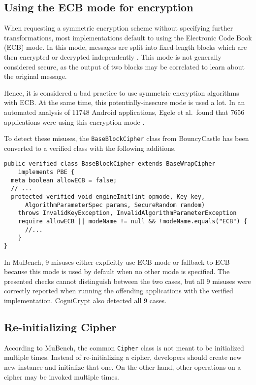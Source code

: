 \documentclass{article}
\newcommand{\etal}{et al.\ }
\begin{document}
\subsection{Using the ECB mode for encryption}\label{sec:MuBench:ECB}

When requesting a symmetric encryption scheme without specifying further transformations,
most implementations default to using the Electronic Code Book (ECB) mode.
In this mode, messages are split into fixed-length blocks which are then encrypted or
decrypted independently .
This mode is not generally considered secure, as the output of two blocks may
be correlated to learn about the original message.

Hence, it is considered a bad practice to use symmetric encryption algorithms with ECB.
At the same time, this potentially-insecure mode is used a lot.
In an automated analysis of \num{11748} Android applications, Egele \etal found that \num{7656}
applications were using this encryption mode .

To detect these misuses, the \texttt{BaseBlockCipher} class from BouncyCastle has been converted
to a verified class with the following additions.

\begin{lstlisting}[style=jGuard]
public verified class BaseBlockCipher extends BaseWrapCipher
    implements PBE {
  meta boolean allowECB = false;
  // ...
  protected verified void engineInit(int opmode, Key key, 
      AlgorithmParameterSpec params, SecureRandom random)
    throws InvalidKeyException, InvalidAlgorithmParameterException
    require allowECB || modeName != null && !modeName.equals("ECB") {
      //...
    }
}
\end{lstlisting}

In MuBench, \num{9} misuses either explicitly use ECB mode or fallback to ECB because this mode
is used by default when no other mode is specified.
The presented checks cannot distinguish between the two cases, but all \num{9} misuses were correctly
reported when running the offending applications with the verified implementation.
CogniCrypt also detected all \num{9} cases.

\subsection{Re-initializing Cipher}\label{sec:Crypto:ReInitCipher}

According to MuBench, the common \texttt{Cipher} class is not meant to be initialized multiple times.
Instead of re-initializing a cipher, developers should create new new instance
and initialize that one.
On the other hand, other operations on a cipher may be invoked multiple times.
\end{document}

